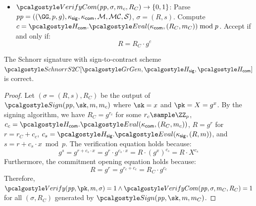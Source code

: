 \begin{definition}
\begin{itemize}
    \item $\algo{VerifyCom}(\params, \sigma, m_c, R_C) \rightarrow \{0, 1\}$: Parse $\params = (\gparam, \kappa_{\mathsf{sig}}, \kappa_{\mathsf{com}}, \mathcal{M}, \mathcal{MC}, \mathcal{S})$, $\sigma = (R, s)$. Compute $c = \algo{H}_{\mathsf{com}}.\algo{Eval}(\kappa_{\mathsf{com}}, (R_C, m_C)) \bmod p$. Accept if and only if:
    \[
      R = R_C \cdot g^c
    \]
  \end{itemize}
\end{definition}

\begin{lemma}\label{lem:schnorr-s2c-correctness}
  The Schnorr signature with sign-to-contract scheme\\ $\algo{SchnorrS2C}[\grgen, \algo{H}_{\mathsf{sig}}, \algo{H}_{\mathsf{com}}]$ is correct.
\end{lemma}

\begin{proof}
  Let $(\sigma = (R, s), R_C)$ be the output of $\algo{Sign}(\params, \sk, m, m_c)$ where $\sk = x$ and $\pk = X = g^x$. By the signing algorithm, we have $R_C = g^{r_c}$ for some $r_c \sample \ZZ_p$, $c_c = \algo{H}_{\mathsf{com}}.\algo{Eval}(\kappa_{\mathsf{com}}, (R_C, m_c))$, $R = g^r$ for $r = r_C + c_c$, $c_s = \algo{H}_{\mathsf{sig}}.\algo{Eval}(\kappa_{\mathsf{sig}}, (R, m))$, and $s = r + c_s \cdot x \bmod p$. The verification equation holds because:
  \[
    g^s = g^{r + c_s \cdot x} = g^r \cdot g^{c_s \cdot x} = R \cdot (g^x)^{c_s} = R \cdot X^{c_s}
  \]
  Furthermore, the commitment opening equation holds because:
  \[
    R = g^r = g^{r_c + c_c} = R_C \cdot g^{c_c}
  \]
  Therefore, $\algo{Verify}(\params, \pk, m, \sigma) = 1 \wedge \algo{VerifyCom}(\params, \sigma, m_C, R_C) = 1$ for all $(\sigma, R_C)$ generated by $\algo{Sign}(\params, \sk, m, m_C)$.
\end{proof}


